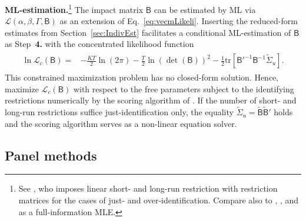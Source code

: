 \textbf{ML-estimation.}\footnote{See \citet{Vlaar2004}, who imposes linear short- and long-run restriction with restriction matrices for the cases of just- and over-identification. Compare also to \citet[Ch.~11, p.~331]{Hamilton1994}, \citet[Ch.~3.2, p.~84]{Lutkepohl2006}, and \citet[Ch.~11.2.2 and p.~315]{KilianLutkepohl2017} as a full-information MLE.} The impact matrix $ \mathsf{B} $ can be estimated by ML via $ \mathcal{L} \left(\alpha, \beta, \Gamma, \mathsf{B} \right) $ as an extension of Eq.~\eqref{eq:vecmLikeli}. Inserting the reduced-form estimates from Section~\ref{sec:IndivEst} facilitates a conditional ML-estimation of $ \mathsf{B} $ as Step~\textbf{4.} with the concentrated likelihood function
\begin{align} \label{eq:svecmLikeli}
\begin{split}
	\ln \mathcal{L}_c \left( \mathsf{B} \right) = & - \frac{KT}{2} \ln \left( 2\pi \right) - \frac{T}{2} \ln \left( \det ( \mathsf{B} ) \right)^2 - \frac{1}{2} \text{tr} \left[ \mathsf{B'}^{-1} \mathsf{B}^{-1} \widetilde{\Sigma}_u \right].
\end{split}
\end{align}
This constrained maximization problem has no closed-form solution. Hence, \cite{BreitungEtAl2004} maximize $ \mathcal{L}_c \left( \mathsf{B} \right) $ with respect to the free parameters subject to the identifying restrictions numerically by the scoring algorithm of \citet{AmisanoGiannini1997}. If the number of short- and long-run restrictions suffice just-identification only, the equality $ \widetilde{\Sigma}_u = \mathsf{\widetilde{B}} \mathsf{\widetilde{B}}' $ holds and the scoring algorithm serves as a non-linear equation solver.


\subsection{Panel methods} \label{sec:Panel}

